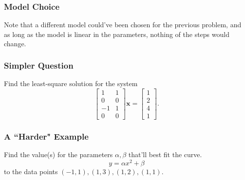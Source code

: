 \documentclass{beamer}
\renewcommand{\vec}[1]{\bm{#1}}
\begin{document}
	\begin{frame}
		\frametitle{Model Choice}
		Note that a different model could've been chosen for the previous problem, and as long as the model is linear in the parameters, nothing of the steps would change.
	\end{frame}

	\begin{frame}
		\frametitle{Simpler Question}
		Find the least-square solution for the system \[\begin{bmatrix}1 & 1 \\ 0 & 0 \\ -1 & 1 \\ 0 & 0\end{bmatrix}\vec{x} = \begin{bmatrix}1 \\ 2 \\ 4 \\ 1\end{bmatrix}.\]
	\end{frame}

	\begin{frame}
		\frametitle{A ``Harder" Example}
		Find the value(s) for the parameters \(\alpha, \beta\) that'll best fit the curve.
		\[y = \alpha x^2 + \beta\] to the data points \((-1, 1), (1, 3), (1, 2), (1, 1)\).
	\end{frame}
\end{document}
